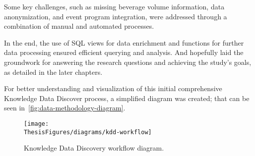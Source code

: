 Some key challenges, such as missing beverage volume information, data anonymization, and event program integration, were addressed through a combination of manual and automated processes.

In the end, the use of SQL views for data enrichment and functions for further data processing ensured efficient querying and analysis.
And hopefully laid the groundwork for answering the research questions and achieving the study's goals, as detailed in the later chapters.

For better understanding and visualization of this initial comprehensive Knowledge Data Discover process, a simplified diagram was created; that can be seen in~\autoref{fig:data-methodology-diagram}.

\begin{figure}[H]
	\centering
	\texttt{[image: \\ThesisFigures/diagrams/kdd-workflow]}
	\caption{Knowledge Data Discovery workflow diagram.}
	\label{fig:data-methodology-diagram}
\end{figure}

